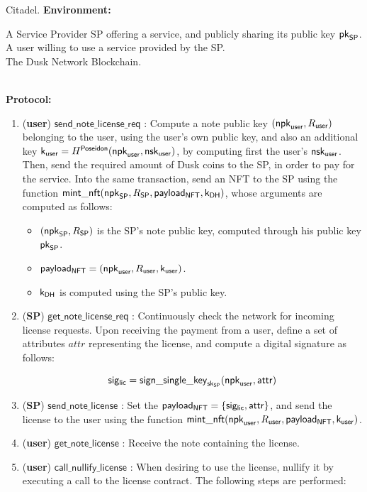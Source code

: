\begin{protocol}{Citadel.}
\label{pro:citadel}
\textbf{Environment:} \par
A Service Provider SP offering a service, and publicly sharing its public key $\mathsf{pk}_{\mathsf{SP}}$. \\
A user willing to use a service provided by the SP. \\
The Dusk Network Blockchain.

\\
\textbf{Protocol:}
	\begin{enumerate}
		\item (\textbf{user}) $\mathsf{send\_note\_license\_req}$ : Compute a note public key $(\mathsf{npk}_{\mathsf{user}}, R_{\mathsf{user}})$ belonging to the user, using the user's own public key, and also an additional key $\mathsf{k}_{\mathsf{user}} = H^\mathsf{Poseidon}(\mathsf{npk}_{\mathsf{user}}, \mathsf{nsk}_{\mathsf{user}})$, by computing first the user's $\mathsf{nsk}_{\mathsf{user}}$. Then, send the required amount of Dusk coins to the SP, in order to pay for the service. Into the same transaction, send an NFT to the SP using the function $\mathsf{mint\_nft}(\mathsf{npk}_{\mathsf{SP}}, R_{\mathsf{SP}}, \mathsf{payload_{NFT}}, \mathsf{k_{DH}})$, whose arguments are computed as follows:
		\begin{itemize}
			\item $(\mathsf{npk}_{\mathsf{SP}}, R_{\mathsf{SP}})$ is the SP's note public key, computed through his public key $\mathsf{pk}_{\mathsf{SP}}$.
			\item $\mathsf{payload_{NFT}} = (\mathsf{npk}_{\mathsf{user}}, R_{\mathsf{user}}, \mathsf{k}_{\mathsf{user}})$.
			\item $\mathsf{k_{DH}}$ is computed using the SP's public key.
		\end{itemize}

		\item (\textbf{SP}) $\mathsf{get\_note\_license\_req}$ : Continuously check the network for incoming license requests. Upon receiving the payment from a user, define a set of attributes $attr$ representing the license, and compute a digital signature as follows:

		$$\mathsf{sig_{lic}}= \mathsf{sign\_single\_key}_{\mathsf{sk}_{\mathsf{SP}}}(\mathsf{npk}_{\mathsf{user}}, \mathsf{attr})$$

		\item (\textbf{SP}) $\mathsf{send\_note\_license}$ : Set the $\mathsf{payload_{NFT}} = \{\mathsf{sig_{lic}}, \mathsf{attr}\}$, and send the license to the user using the function $\mathsf{mint\_nft}(\mathsf{npk}_{\mathsf{user}}, R_{\mathsf{user}}, \mathsf{payload_{NFT}}, \mathsf{k}_{\mathsf{user}})$.

		\item (\textbf{user}) $\mathsf{get\_note\_license}$ : Receive the note containing the license. 

		\item (\textbf{user}) $\mathsf{call\_nullify\_license}$ : When desiring to use the license, nullify it by executing a call to the license contract. The following steps are performed:


\end{enumerate}
\end{protocol}
